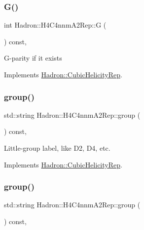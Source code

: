 \subsubsection{\texorpdfstring{G()}{G()}\hspace{0.1cm}{\footnotesize\ttfamily [3/3]}}
{\footnotesize\ttfamily int Hadron\+::\+H4\+C4nnm\+A2\+Rep\+::G (\begin{DoxyParamCaption}{ }\end{DoxyParamCaption}) const\hspace{0.3cm}{\ttfamily [inline]}, {\ttfamily [virtual]}}

G-\/parity if it exists 

Implements \mbox{\hyperlink{structHadron_1_1CubicHelicityRep_a50689f42be1e6170aa8cf6ad0597018b}{Hadron\+::\+Cubic\+Helicity\+Rep}}.

\mbox{\label{structHadron_1_1H4C4nnmA2Rep_ae437f39da33de8e2ad9b152325fa7ce2}} 
\subsubsection{\texorpdfstring{group()}{group()}\hspace{0.1cm}{\footnotesize\ttfamily [1/5]}}
{\footnotesize\ttfamily std\+::string Hadron\+::\+H4\+C4nnm\+A2\+Rep\+::group (\begin{DoxyParamCaption}{ }\end{DoxyParamCaption}) const\hspace{0.3cm}{\ttfamily [inline]}, {\ttfamily [virtual]}}

Little-\/group label, like D2, D4, etc. 

Implements \mbox{\hyperlink{structHadron_1_1CubicHelicityRep_a101a7d76cd8ccdad0f272db44b766113}{Hadron\+::\+Cubic\+Helicity\+Rep}}.

\mbox{\label{structHadron_1_1H4C4nnmA2Rep_ae437f39da33de8e2ad9b152325fa7ce2}} 
\subsubsection{\texorpdfstring{group()}{group()}\hspace{0.1cm}{\footnotesize\ttfamily [2/5]}}
{\footnotesize\ttfamily std\+::string Hadron\+::\+H4\+C4nnm\+A2\+Rep\+::group (\begin{DoxyParamCaption}{ }\end{DoxyParamCaption}) const\hspace{0.3cm}{\ttfamily [inline]}, {\ttfamily [virtual]}}


